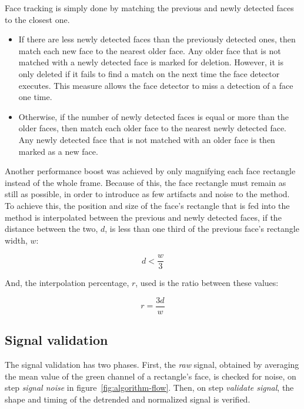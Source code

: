 Face tracking is simply done by matching the previous and newly detected faces
to the closest one.
\begin{itemize}
  \item If there are less newly detected faces than the previously detected
        ones, then match each new face to the nearest older face. Any older
        face that is not matched with a newly detected face is marked for
        deletion. However, it is only deleted if it fails to find a match
        on the next time the face detector executes. This measure allows the
        face detector to miss a detection of a face one time.
  \item Otherwise, if the number of newly detected faces is equal or more than
        the older faces, then match each older face to the nearest newly
        detected face. Any newly detected face that is not matched with an
        older face is then marked as a new face.
\end{itemize}

Another performance boost was achieved by only magnifying each face
rectangle instead of the whole frame. Because of this, the face rectangle must
remain as still as possible, in order to introduce as few artifacts and noise
to the \evm{} method. To achieve this, the position and size of the face's
rectangle that is fed into the \evm{} method is interpolated between the
previous and newly detected faces, if the distance between the two, $d$,
is less than one third of the previous face's rectangle width, $w$:

\begin{equation}
  d < \frac{w}{3}
\end{equation}

And, the interpolation percentage, $r$, used is the ratio between these values:

\begin{equation}
  r = \frac{3d}{w}
\end{equation}

\subsection{Signal validation} \label{sec:impl:validations}

The signal validation has two phases. First, the \emph{raw} signal,
obtained by averaging the mean value of the green channel of
a rectangle's face, is checked for noise,
on step \emph{signal noise} in figure~\ref{fig:algorithm-flow}.
Then, on step \emph{validate signal}, the shape and timing of the detrended
and normalized signal is verified.

